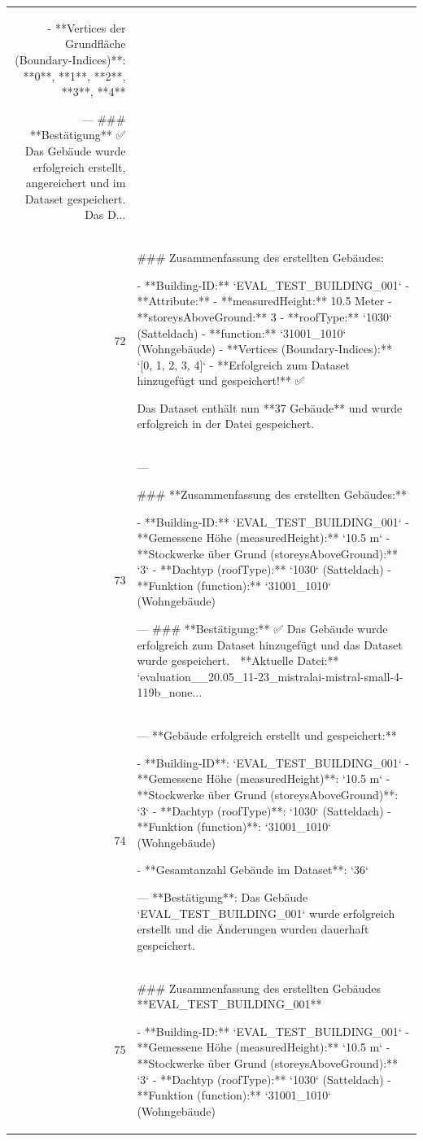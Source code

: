 \documentclass[a4paper,11pt]{article}
\begin{document}
\begin{table}[ht]
\begin{tabular}{r p{12cm}}
- **Vertices der Grundfläche (Boundary-Indices)**:
  **0**, **1**, **2**, **3**, **4**

---
\#\#\# **Bestätigung**
✅ Das Gebäude wurde erfolgreich erstellt, angereichert und im Dataset gespeichert. Das D... \\
72 & \#\#\# Zusammenfassung des erstellten Gebäudes:

- **Building-ID:** `EVAL\_TEST\_BUILDING\_001`
- **Attribute:**
  - **measuredHeight:** 10.5 Meter
  - **storeysAboveGround:** 3
  - **roofType:** `1030` (Satteldach)
  - **function:** `31001\_1010` (Wohngebäude)
- **Vertices (Boundary-Indices):** `[0, 1, 2, 3, 4]`
- **Erfolgreich zum Dataset hinzugefügt und gespeichert!** ✅

Das Dataset enthält nun **37 Gebäude** und wurde erfolgreich in der Datei gespeichert. \\
73 & ---

\#\#\# **Zusammenfassung des erstellten Gebäudes:**

- **Building-ID:** `EVAL\_TEST\_BUILDING\_001`
- **Gemessene Höhe (measuredHeight):** `10.5 m`
- **Stockwerke über Grund (storeysAboveGround):** `3`
- **Dachtyp (roofType):** `1030` (Satteldach)
- **Funktion (function):** `31001\_1010` (Wohngebäude)

---
\#\#\# **Bestätigung:**
✅ Das Gebäude wurde erfolgreich zum Dataset hinzugefügt und das Dataset wurde gespeichert.
📁 **Aktuelle Datei:** `evaluation\_\_20.05\_11-23\_mistralai-mistral-small-4-119b\_none... \\
74 & ---
**Gebäude erfolgreich erstellt und gespeichert:**

- **Building-ID**: `EVAL\_TEST\_BUILDING\_001`
- **Gemessene Höhe (measuredHeight)**: `10.5 m`
- **Stockwerke über Grund (storeysAboveGround)**: `3`
- **Dachtyp (roofType)**: `1030` (Satteldach)
- **Funktion (function)**: `31001\_1010` (Wohngebäude)

- **Gesamtanzahl Gebäude im Dataset**: `36`

---
**Bestätigung**: Das Gebäude `EVAL\_TEST\_BUILDING\_001` wurde erfolgreich erstellt und die Änderungen wurden dauerhaft gespeichert. \\
75 & \#\#\# Zusammenfassung des erstellten Gebäudes **EVAL\_TEST\_BUILDING\_001**

- **Building-ID:** `EVAL\_TEST\_BUILDING\_001`
- **Gemessene Höhe (measuredHeight):** `10.5 m`
- **Stockwerke über Grund (storeysAboveGround):** `3`
- **Dachtyp (roofType):** `1030` (Satteldach)
- **Funktion (function):** `31001\_1010` (Wohngebäude)


\end{tabular}
\end{table}
\end{document}

